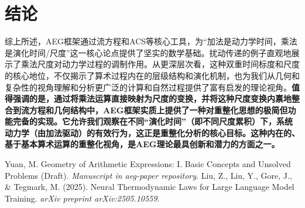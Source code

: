 \documentclass[UTF8]{ctexart}
\begin{document}
\section{结论}
综上所述，AEG框架通过流方程和ACS等核心工具，为“加法是动力学时间，乘法是演化时间/尺度”这一核心论点提供了坚实的数学基础。扰动传递的例子直观地展示了乘法尺度对动力学过程的调制作用。从更深层次看，这种双重时间标度和尺度的核心地位，不仅揭示了算术过程内在的层级结构和演化机制，也为我们从几何和复杂性的视角理解和分析更广泛的计算和自然过程提供了富有启发的理论视角。\textbf{值得强调的是，通过将乘法运算直接映射为尺度的变换，并将这种尺度变换内禀地整合到流方程和几何结构中，AEG框架实质上提供了一种对重整化思想的极简但功能完备的实现。它允许我们观察在不同“演化时间”（即不同尺度累积）下，系统动力学（由加法驱动）的有效行为，这正是重整化分析的核心目标。这种内在的、基于基本算术运算的重整化视角，是AEG理论最具创新和潜力的方面之一。}

\begin{thebibliography}{9}
     Yuan, M. Geometry of Arithmetic Expressions: I. Basic Concepts and Unsolved Problems (Draft). \textit{Manuscript in aeg-paper repository}.
     Liu, Z., Liu, Y., Gore, J., \& Tegmark, M. (2025). Neural Thermodynamic Laws for Large Language Model Training. \textit{arXiv preprint arXiv:2505.10559}.
\end{thebibliography}
\end{document}
